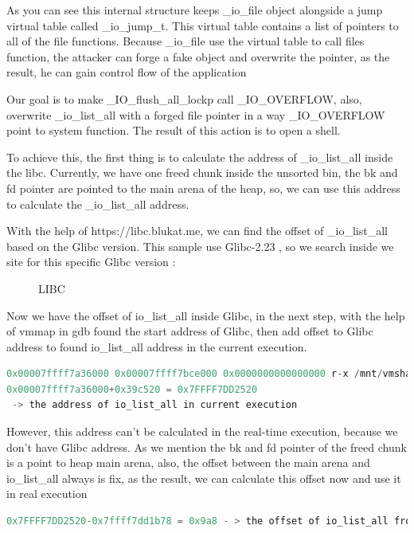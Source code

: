 \documentclass{masterthesis}
\begin{document}
As you can see this internal structure keeps \_io\_file object alongside a jump virtual table called \_io\_jump\_t. This virtual table contains a list of pointers to all of the file functions. Because \_io\_file use the virtual table to call files function, the attacker can forge a fake object and overwrite the pointer, as the result, he can gain control flow of the application

Our goal is to make \_IO\_flush\_all\_lockp call \_IO\_OVERFLOW, also, overwrite \_io\_list\_all with a forged file pointer in a way \_IO\_OVERFLOW point to system function. The result of this action is to open a shell.

To achieve this, the first thing is to calculate the address of \_io\_list\_all inside the libc. Currently, we have one freed chunk inside the unsorted bin, the bk and fd pointer are pointed to the main arena of the heap, so, we can use this address to calculate the \_io\_list\_all address. 

With the help of https://libc.blukat.me, we can find the offset of \_io\_list\_all based on the Glibc version. This sample use Glibc-2.23 , so we search inside we site for this specific Glibc version :

\begin{figure}[h!]
  \caption{LIBC}
\end{figure}


Now we have the offset of io\_list\_all inside Glibc, in the next step, with the help of vmmap in gdb found the start address of Glibc, then add offset to Glibc address to found io\_list\_all address in the current execution.
\begin{lstlisting}[language=c,frame=tlrb]
0x00007ffff7a36000 0x00007ffff7bce000 0x0000000000000000 r-x /mnt/vmshare/MasterThesis/libc223/libc.so.6
0x00007ffff7a36000+0x39c520 = 0x7FFFF7DD2520
 -> the address of io_list_all in current execution
\end{lstlisting}



However, this address can’t be calculated in the real-time execution, because we don’t have Glibc address. As we mention the bk and fd pointer of the freed chunk is a point to heap main arena, also, the offset between the main arena and io\_list\_all always is fix, as the result, we can calculate this offset now and use it in real execution 
\begin{lstlisting}[language=c,frame=tlrb]
0x7FFFF7DD2520-0x7ffff7dd1b78 = 0x9a8 - > the offset of io_list_all from main arena
\end{lstlisting}
\end{document}
